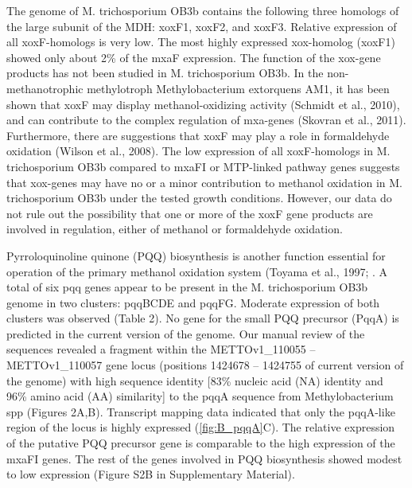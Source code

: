 The genome of M. trichosporium OB3b contains the following three homologs of the large subunit of the MDH: xoxF1, xoxF2, and xoxF3.
Relative expression of all xoxF-homologs is very low.
The most highly expressed xox-homolog (xoxF1) showed only about 2\% of the mxaF expression.
The function of the xox-gene products has not been studied in M. trichosporium OB3b.
In the non-methanotrophic methylotroph Methylobacterium extorquens AM1, it has been shown that xoxF may display methanol-oxidizing activity (Schmidt et al., 2010), and can contribute to the complex regulation of mxa-genes (Skovran et al., 2011).
Furthermore, there are suggestions that xoxF may play a role in formaldehyde oxidation (Wilson et al., 2008).
The low expression of all xoxF-homologs in M. trichosporium OB3b compared to mxaFI or MTP-linked pathway genes suggests that xox-genes may have no or a minor contribution to methanol oxidation in M. trichosporium OB3b under the tested growth conditions.
However, our data do not rule out the possibility that one or more of the xoxF gene products are involved in regulation, either of methanol or formaldehyde oxidation.

Pyrroloquinoline quinone (PQQ) biosynthesis is another function essential for operation of the primary methanol oxidation system (Toyama et al., 1997; \cite{anthony2002}.
A total of six pqq genes appear to be present in the M. trichosporium OB3b genome in two clusters: pqqBCDE and pqqFG.
Moderate expression of both clusters was observed (Table 2).
No gene for the small PQQ precursor (PqqA) is predicted in the current version of the genome.
Our manual review of the sequences revealed a fragment within the METTOv1\_110055 – METTOv1\_110057 gene locus (positions 1424678 – 1424755 of current version of the genome) with high sequence identity [83\% nucleic acid (NA) identity and 96\% amino acid (AA) similarity] to the pqqA sequence from Methylobacterium spp (Figures 2A,B).
Transcript mapping data indicated that only the pqqA-like region of the locus is highly expressed (\ref{fig:B_pqqA}C).
The relative expression of the putative PQQ precursor gene is comparable to the high expression of the mxaFI genes.
The rest of the genes involved in PQQ biosynthesis showed modest to low expression (Figure S2B in Supplementary Material).

